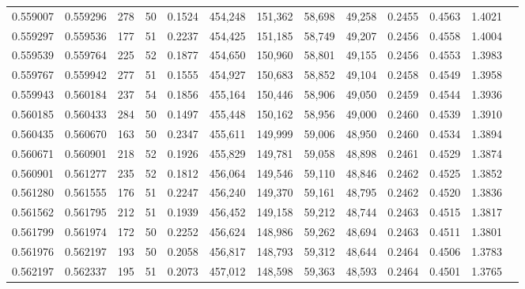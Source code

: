 \begin{tabular}{rrrrrrrrrrrrr}
0.559007 & 0.559296 &   278 &  50 &                                     0.1524 & 454,248 & 151,362 &  58,698 &  49,258 & 0.2455 & 0.4563 & 1.4021 \\
0.559297 & 0.559536 &   177 &  51 &                                     0.2237 & 454,425 & 151,185 &  58,749 &  49,207 & 0.2456 & 0.4558 & 1.4004 \\
0.559539 & 0.559764 &   225 &  52 &                                     0.1877 & 454,650 & 150,960 &  58,801 &  49,155 & 0.2456 & 0.4553 & 1.3983 \\
0.559767 & 0.559942 &   277 &  51 &                                     0.1555 & 454,927 & 150,683 &  58,852 &  49,104 & 0.2458 & 0.4549 & 1.3958 \\
0.559943 & 0.560184 &   237 &  54 &                                     0.1856 & 455,164 & 150,446 &  58,906 &  49,050 & 0.2459 & 0.4544 & 1.3936 \\
0.560185 & 0.560433 &   284 &  50 &                                     0.1497 & 455,448 & 150,162 &  58,956 &  49,000 & 0.2460 & 0.4539 & 1.3910 \\
0.560435 & 0.560670 &   163 &  50 &                                     0.2347 & 455,611 & 149,999 &  59,006 &  48,950 & 0.2460 & 0.4534 & 1.3894 \\
0.560671 & 0.560901 &   218 &  52 &                                     0.1926 & 455,829 & 149,781 &  59,058 &  48,898 & 0.2461 & 0.4529 & 1.3874 \\
0.560901 & 0.561277 &   235 &  52 &                                     0.1812 & 456,064 & 149,546 &  59,110 &  48,846 & 0.2462 & 0.4525 & 1.3852 \\
0.561280 & 0.561555 &   176 &  51 &                                     0.2247 & 456,240 & 149,370 &  59,161 &  48,795 & 0.2462 & 0.4520 & 1.3836 \\
0.561562 & 0.561795 &   212 &  51 &                                     0.1939 & 456,452 & 149,158 &  59,212 &  48,744 & 0.2463 & 0.4515 & 1.3817 \\
0.561799 & 0.561974 &   172 &  50 &                                     0.2252 & 456,624 & 148,986 &  59,262 &  48,694 & 0.2463 & 0.4511 & 1.3801 \\
0.561976 & 0.562197 &   193 &  50 &                                     0.2058 & 456,817 & 148,793 &  59,312 &  48,644 & 0.2464 & 0.4506 & 1.3783 \\
0.562197 & 0.562337 &   195 &  51 &                                     0.2073 & 457,012 & 148,598 &  59,363 &  48,593 & 0.2464 & 0.4501 & 1.3765 \\

\end{tabular}
